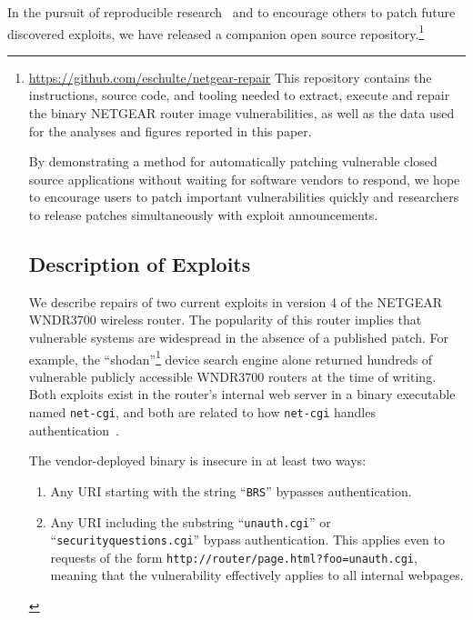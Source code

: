 \documentclass{sigcomm-alternate}
\begin{document}
In the pursuit of reproducible
research~\cite{buckheit1995wavelab,mesirov2010accessible} and to encourage
others to patch
future discovered exploits, we have released a companion open source
repository.\footnote{\url{https://github.com/eschulte/netgear-repair}
This repository contains the instructions, source
code, and tooling needed to extract, execute and repair the binary
NETGEAR router image vulnerabilities, as well as the data used for the
analyses and figures reported  in this paper.

By demonstrating a method for automatically patching vulnerable closed source
applications without waiting for software vendors to respond, we hope to encourage
users to patch important vulnerabilities quickly and researchers to
release patches simultaneously
with exploit announcements.

\section{Description of Exploits}
\label{sec-2}
We describe repairs of two current exploits in version 4 of the NETGEAR WNDR3700
wireless router. The popularity of this router implies that vulnerable
systems are widespread in the absence of a published patch. For example, the
``shodan''\footnote{\url{http://www.shodanhq.com/search?q=wndr3700v4+http}}
device search engine alone returned hundreds of vulnerable publicly
accessible WNDR3700 routers at the time of writing.
Both exploits exist in the router's internal web server in a binary
executable named \texttt{net-cgi}, and both are related to how
\texttt{net-cgi} handles authentication~\cite{zcutlip}.

The vendor-deployed binary is insecure in at least two ways: 
\begin{enumerate}
\item Any URI starting with the string ``{\tt BRS}'' bypasses authentication.

\item Any URI including the substring ``{\tt unauth.cgi}'' or
  ``{\tt securityquestions.cgi}'' bypass authentication. This applies
  even to requests of the form 
  \texttt{http://router/page.html?foo=unauth.cgi}, meaning that 
  the vulnerability effectively applies to all internal webpages. 
\end{enumerate}

}
\end{document}
